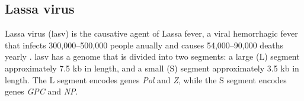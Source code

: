 \subsection{Lassa virus}

Lassa virus (\gls{lasv}) is the causative agent of Lassa fever, a viral hemorrhagic fever that infects 300,000--500,000 people anually and causes 54,000--90,000 deaths yearly \cite{three, lassa, papers}.
\gls{lasv} has a genome that is divided into two segments: a large (L) segment approximately 7.5 kb in length, and a small (S) segment approximately 3.5 kb in length.
The L segment encodes genes \textit{Pol} and \textit{Z}, while the S segment encodes genes \textit{GPC} and \textit{NP}.



\cleardoublepage

